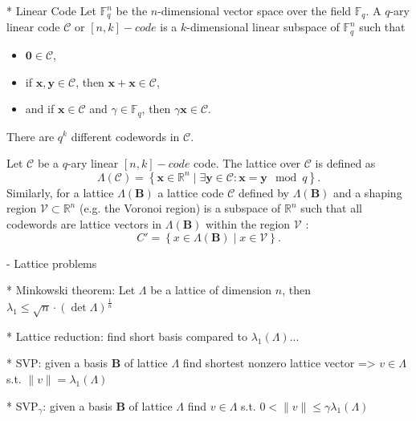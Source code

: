 \documentclass[
  a4paper,  %
  twoside,  %
  bibliography=totoc,
  headsepline,
  cleardoublepage=empty,
  parskip=half,
  draft=false
]{scrbook}
\begin{document}
  * Linear Code \cite{VanLint12} %
    Let $\mathbb{F}_q^n$ be the $n$-dimensional vector space over the field $\mathbb{F}_q$. A $q$-ary linear code $\mathcal{C}$ or $[n, k]-code$ is a $k$-dimensional linear subspace of $\mathbb{F}_q^n$ such that 
    \begin{itemize}
      \item $\textbf{0} \in \mathcal{C}$,
      \item if $\textbf{x}, \textbf{y} \in \mathcal{C}$, then $\textbf{x} + \textbf{x} \in \mathcal{C}$,
      \item and if $\textbf{x} \in \mathcal{C}$ and $\gamma \in \mathbb{F}_q$, then $\gamma \textbf{x} \in \mathcal{C}$.
    \end{itemize}
    There are $q^k$ different codewords in $\mathcal{C}$.

    Let $\mathcal{C}$ be a $q$-ary linear $[n, k]-code$ code. The lattice over $\mathcal{C}$ is defined as %
    \begin{equation}
      \Lambda(\mathcal{C}) = \left\{ \textbf{x} \in \mathbb{R}^n \mid \exists \textbf{y} \in \mathcal{C} : \textbf{x} = \textbf{y} \mod q  \right\}.
    \end{equation} %
    Similarly, for a lattice $\Lambda(\textbf{B})$ a lattice code $\mathcal{C}$ defined by $\Lambda(\textbf{B})$ and a shaping region $\mathcal{V} \subset \mathbb{R}^n$ (e.g. the Voronoi region) is a subspace of $\mathbb{R}^n$ such that all codewords are lattice vectors in $\Lambda(\textbf{B})$ within the region $\mathcal{V}$ \cite{SFS08}:
    \begin{equation}
      C' = \left\{ x \in \Lambda(\textbf{B}) \mid x \in \mathcal{V} \right\}.
    \end{equation} %

- Lattice problems

  * Minkowski theorem: Let $\Lambda$ be a lattice of dimension $n$, then $\lambda_1 \leq \sqrt{n} \cdot (\det \Lambda)^{\frac{1}{n}}$

  * Lattice reduction: find short basis compared to $\lambda_1(\Lambda)$... 

  * SVP: given a basis $\textbf{B}$ of lattice $\Lambda$ find shortest nonzero lattice vector =>  $v\in \Lambda$ s.t. $\| v \| = \lambda_1(\Lambda)$

  * SVP$_\gamma$: given a basis $\textbf{B}$ of lattice $\Lambda$ find  $v\in \Lambda$ s.t. $0 < \| v \| \leq \gamma \lambda_1(\Lambda)$
\end{document}
